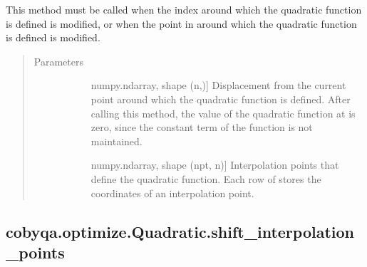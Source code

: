 \documentclass[letterpaper,10pt,english]{sphinxmanual}
\begin{document}
\begin{fulllineitems}
\begin{fulllineitems}
\sphinxAtStartPar
This method must be called when the index around which the quadratic
function is defined is modified, or when the point in  around
which the quadratic function is defined is modified.
\begin{quote}\begin{description}
\item[{Parameters}] \leavevmode\begin{description}
\item[{}] \leavevmode{[}numpy.ndarray, shape (n,){]}
\sphinxAtStartPar
Displacement from the current point  around which the
quadratic function is defined. After calling this method, the value
of the quadratic function at  is zero, since the
constant term of the function is not maintained.

\item[{}] \leavevmode{[}numpy.ndarray, shape (npt, n){]}
\sphinxAtStartPar
Interpolation points that define the quadratic function. Each row of
 stores the coordinates of an interpolation point.

\end{description}

\end{description}\end{quote}

\end{fulllineitems}



\subsection{cobyqa.optimize.Quadratic.shift\_interpolation\_points}
\label{\detokenize{refs/generated/cobyqa.optimize.Quadratic.shift_interpolation_points:cobyqa-optimize-quadratic-shift-interpolation-points}}\label{\detokenize{refs/generated/cobyqa.optimize.Quadratic.shift_interpolation_points::doc}}


\end{fulllineitems}
\end{document}

